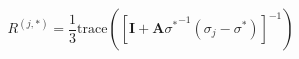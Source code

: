 \begin{equation}
    R^{(j,*)} = \frac{1}{3}\text{trace}\left(\left[\mathbf{I}+\mathbf{A}{\sigma^*}^{-1}(\sigma_j-\sigma^*)\right]^{-1}\right)
\label{eq:emt_r_ellipsoids_random}
\end{equation}
